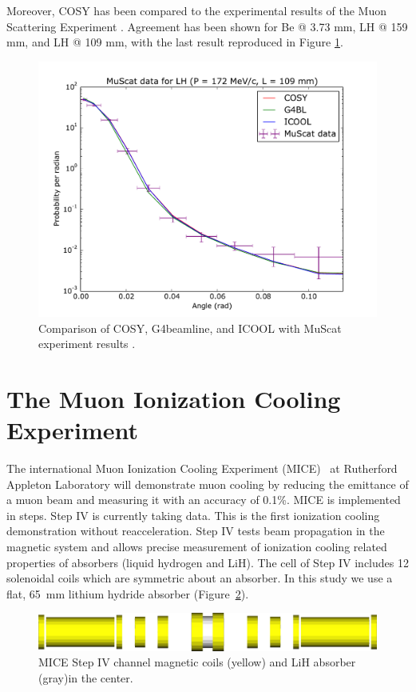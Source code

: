 \documentclass{jacow}
\begin{document}
Moreover, COSY has been compared to the experimental results of the Muon Scattering Experiment \cite{muscat}. Agreement has been shown for Be @ 3.73 mm, LH @ 159 mm, and LH @ 109 mm, with the last result reproduced in Figure \ref{fig:muscat}.

\begin{figure}[!h]
\centering
\includegraphics*[width=\columnwidth]{Figures/172.109.muscat.pdf}
\caption{Comparison of COSY, G4beamline, and ICOOL with MuScat experiment results \cite{muscat}.}
\label{fig:muscat}
\end{figure}

\section{The Muon Ionization Cooling Experiment}
The international Muon Ionization Cooling Experiment (MICE)~\cite{mice} at Rutherford Appleton Laboratory will demonstrate muon cooling by reducing the emittance of a muon beam and measuring it with an accuracy of 0.1\%. MICE is implemented in steps. Step IV is currently taking data. This is the first ionization cooling demonstration without reacceleration. Step IV tests beam propagation in the magnetic system and allows precise measurement of ionization cooling related properties of absorbers (liquid hydrogen and LiH). The cell of Step IV includes 12 solenoidal coils which are symmetric about an absorber. In this study we use a flat, 65~mm lithium hydride absorber (Figure~\ref{fig:mice_channel}).
%
\begin{figure}[h!]
\centering
\includegraphics*[width=\columnwidth]{Figures/mice_channel.png}
\caption{MICE Step IV channel magnetic coils (yellow) and LiH absorber (gray)in the center.}
\label{fig:mice_channel}
\end{figure}
\end{document}
